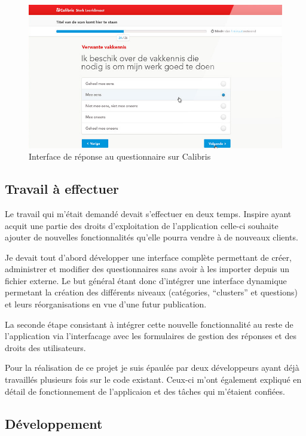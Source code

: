 \documentclass[12pt,a4paper]{book}
\begin{document}
\begin{figure}[htp]
\centering
\includegraphics[scale=0.6]{img/calibris2.png}
 \caption{Interface de réponse au questionnaire sur Calibris}
 \label{fig.calibris2}
\end{figure}

\subsection{Travail à effectuer}

Le travail qui m'était demandé devait s'effectuer en deux temps. Inspire ayant acquit une partie des droits d'exploitation de l'application celle-ci souhaite ajouter de nouvelles fonctionnalités qu'elle pourra vendre à de nouveaux clients.

Je devait tout d'abord développer une interface complète permettant de créer, administrer et modifier des questionnaires sans avoir à les importer depuis un fichier externe. Le but général étant donc d'intégrer une interface dynamique permetant la création des différents niveaux (catégories, ``clusters'' et questions) et leurs réorganisations en vue d'une futur publication.

La seconde étape consistant à intégrer cette nouvelle fonctionnalité au reste de l'application via l'interfacage avec les formulaires de gestion des réponses et des droits des utilisateurs.

Pour la réalisation de ce projet je suis épaulée par deux développeurs ayant déjà travaillés plusieurs fois sur le code existant. Ceux-ci m'ont également expliqué en détail de fonctionnement de l'applicaion et des tâches qui m'étaient confiées.

\subsection{Développement}
\end{document}
